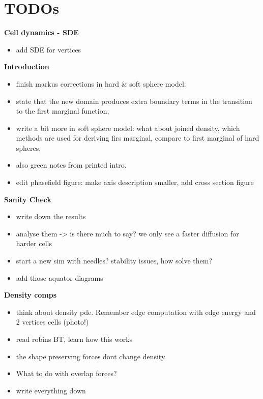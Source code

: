 \section{TODOs}

\textbf{Cell dynamics - SDE}
\begin{itemize}
    \item add SDE for vertices
\end{itemize}

\textbf{Introduction}
\begin{itemize}
    \item finish markus corrections in hard & soft sphere model: 
    \item state that the new domain produces extra boundary terms in the transition to the first marginal function, 
    \item write a bit more in soft sphere model: what about joined density, which methods are used for deriving firs marginal, compare to first marginal of hard spheres,
    \item also green notes from printed intro. 
    \item edit phasefield figure: make axis description smaller, add cross section figure
\end{itemize}

\textbf{Sanity Check}
\begin{itemize}
    \item write down the results 
    \item analyse them -> is there much to say? we only see a faster diffusion for harder cells 
    \item start a new sim with needles? stability issues, how solve them? 
    \item add those aquator diagrams 
\end{itemize}

\textbf{Density comps}
\begin{itemize}
    \item think about density pde. Remember edge computation with edge energy and 2 vertices cells (photo!)
    \item read robins BT, learn how this works 
    \item the shape preserving forces dont change density 
    \item What to do with overlap forces?  
    \item write everything down      
\end{itemize}

